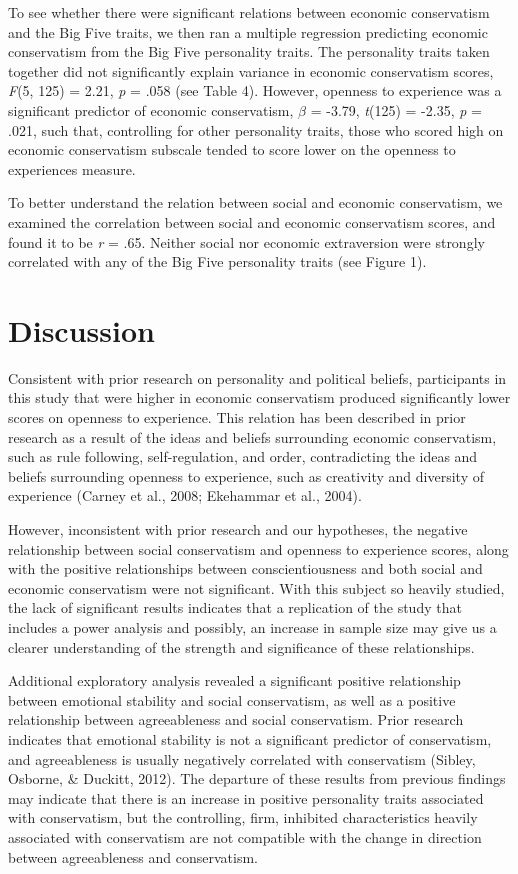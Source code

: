\documentclass[man]{apa6}
\begin{document}
To see whether there were significant relations between economic
conservatism and the Big Five traits, we then ran a multiple regression
predicting economic conservatism from the Big Five personality traits.
The personality traits taken together did not significantly explain
variance in economic conservatism scores, \emph{F}(5, 125) = 2.21,
\emph{p} = .058 (see Table 4). However, openness to experience was a
significant predictor of economic conservatism, \(\beta\) = -3.79,
\emph{t}(125) = -2.35, \emph{p} = .021, such that, controlling for other
personality traits, those who scored high on economic conservatism
subscale tended to score lower on the openness to experiences measure.

To better understand the relation between social and economic
conservatism, we examined the correlation between social and economic
conservatism scores, and found it to be \emph{r} = .65. Neither social
nor economic extraversion were strongly correlated with any of the Big
Five personality traits (see Figure 1).

\section{Discussion}\label{discussion}

Consistent with prior research on personality and political beliefs,
participants in this study that were higher in economic conservatism
produced significantly lower scores on openness to experience. This
relation has been described in prior research as a result of the ideas
and beliefs surrounding economic conservatism, such as rule following,
self-regulation, and order, contradicting the ideas and beliefs
surrounding openness to experience, such as creativity and diversity of
experience (Carney et al., 2008; Ekehammar et al., 2004).

However, inconsistent with prior research and our hypotheses, the
negative relationship between social conservatism and openness to
experience scores, along with the positive relationships between
conscientiousness and both social and economic conservatism were not
significant. With this subject so heavily studied, the lack of
significant results indicates that a replication of the study that
includes a power analysis and possibly, an increase in sample size may
give us a clearer understanding of the strength and significance of
these relationships.

Additional exploratory analysis revealed a significant positive
relationship between emotional stability and social conservatism, as
well as a positive relationship between agreeableness and social
conservatism. Prior research indicates that emotional stability is not a
significant predictor of conservatism, and agreeableness is usually
negatively correlated with conservatism (Sibley, Osborne, \& Duckitt,
2012). The departure of these results from previous findings may
indicate that there is an increase in positive personality traits
associated with conservatism, but the controlling, firm, inhibited
characteristics heavily associated with conservatism are not compatible
with the change in direction between agreeableness and conservatism.
\end{document}
